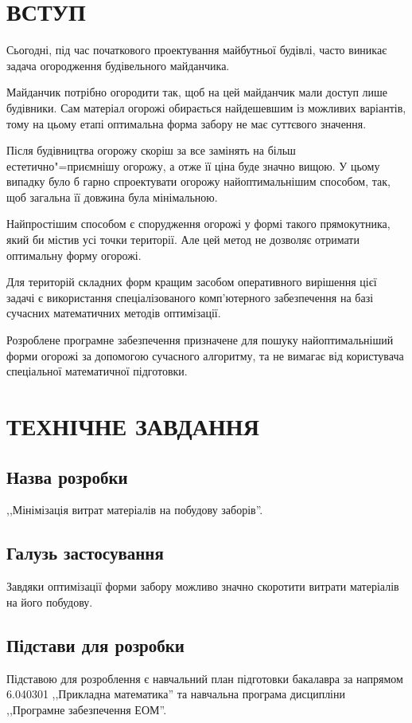 \documentclass[simple,14pt,utf8,ukrainian]{eskdtext}
\begin{document}
\section*{ВСТУП}
  Сьогодні, під час початкового проектування майбутньої будівлі, часто виникає
  задача огородження будівельного майданчика.

  Майданчик потрібно огородити так, щоб на цей майданчик мали доступ лише
  будівники.
  Сам матеріал огорожі обирається найдешевшим із можливих варіантів, тому
  на цьому етапі оптимальна форма забору не має суттєвого значення.

  Після будівництва огорожу скоріш за все замінять на більш
  естетично"=приємнішу огорожу, а отже її ціна буде значно вищою.
  У цьому випадку було б гарно спроектувати огорожу найоптимальнішим способом,
  так, щоб загальна її довжина була мінімальною.

  Найпростішим способом є спорудження огорожі у формі такого прямокутника,
  який би містив усі точки території.
  Але цей метод не дозволяє отримати оптимальну форму огорожі.

  Для територій складних форм кращим засобом оперативного вирішення цієї
  задачі є використання спеціалізованого комп’ютерного забезпечення на базі
  сучасних математичних методів оптимізації.

  Розроблене програмне забезпечення призначене для пошуку найоптимальніший
  форми огорожі за допомогою сучасного алгоритму, та не вимагає від
  користувача спеціальної математичної підготовки.
\newpage

\section{\MakeUppercase{Технічне завдання}}
  \subsection*{Назва розробки}
    ,,Мінімізація витрат матеріалів на побудову заборів''.
  \subsection*{Галузь застосування}
    Завдяки оптимізації форми забору можливо значно скоротити витрати
    матеріалів на його побудову.

  \subsection*{Підстави для розробки}
    Підставою для розроблення є навчальний план підготовки бакалавра за
    напрямом 6.040301 ,,Прикладна математика'' та навчальна програма
    дисципліни ,,Програмне забезпечення ЕОМ''.
\end{document}
